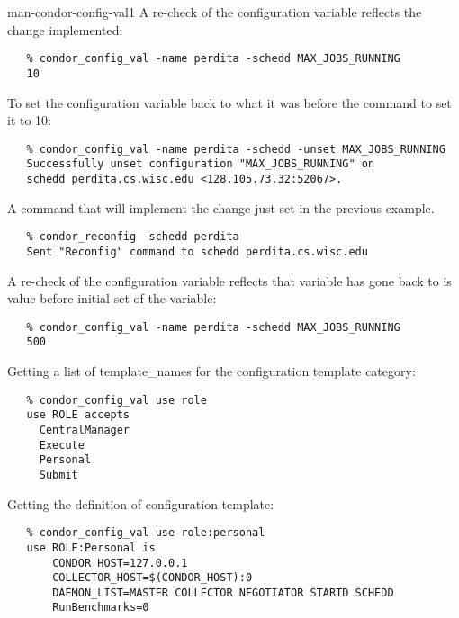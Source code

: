 \begin{ManPage}{}{man-condor-config-val}{1}
A re-check of the configuration variable reflects the change implemented:
\footnotesize
\begin{verbatim}
   % condor_config_val -name perdita -schedd MAX_JOBS_RUNNING
   10
\end{verbatim}
\normalsize

To set the configuration variable 
back to what it was before the command to set it to 10:
\footnotesize
\begin{verbatim}
   % condor_config_val -name perdita -schedd -unset MAX_JOBS_RUNNING
   Successfully unset configuration "MAX_JOBS_RUNNING" on 
   schedd perdita.cs.wisc.edu <128.105.73.32:52067>.
\end{verbatim}
\normalsize

A command that will implement the change just set in the previous
example.
\footnotesize
\begin{verbatim}
   % condor_reconfig -schedd perdita
   Sent "Reconfig" command to schedd perdita.cs.wisc.edu
\end{verbatim}
\normalsize

A re-check of the configuration variable reflects that variable
has gone back to is value before initial set of the variable:
\footnotesize
\begin{verbatim}
   % condor_config_val -name perdita -schedd MAX_JOBS_RUNNING
   500
\end{verbatim}
\normalsize

Getting a list of template\_names for the  configuration
template category:
\footnotesize
\begin{verbatim}
   % condor_config_val use role
   use ROLE accepts
     CentralManager
     Execute
     Personal
     Submit
\end{verbatim}
\normalsize

Getting the definition of  configuration template:
\footnotesize
\begin{verbatim}
   % condor_config_val use role:personal
   use ROLE:Personal is
   	   CONDOR_HOST=127.0.0.1
	   COLLECTOR_HOST=$(CONDOR_HOST):0
	   DAEMON_LIST=MASTER COLLECTOR NEGOTIATOR STARTD SCHEDD
	   RunBenchmarks=0
\end{verbatim}
\normalsize

\end{ManPage}
